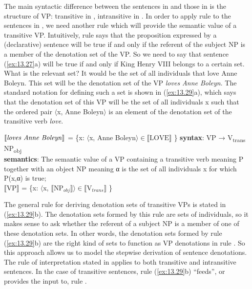 The main syntactic difference between the sentences in  and those in  is the structure of VP: transitive in , intransitive in . In order to apply rule  to the sentences in , we need another rule which will provide the semantic value of a transitive VP. Intuitively, rule  says that the proposition expressed by a (declarative) sentence will be true if and only if the referent of the subject NP is a member of the denotation set of the VP. So we need to say that sentence (\ref{ex:13.27}a) will be true if and only if King Henry VIII belongs to a certain set. What is the relevant set? It would be the set of all individuals that love Anne Boleyn. This set will be the denotation set of the VP \textit{loves Anne Boleyn}. The standard notation for defining such a set is shown in (\ref{ex:13.29}a), which says that the denotation set of this VP will be the set of all individuals x such that the ordered pair $\langle$x, Anne Boleyn$\rangle$ is an element of the denotation set of the transitive verb \textit{love}.


\ea \label{ex:13.29}
\ea $\llbracket\text{\textit{loves Anne Boleyn}}\rrbracket$  = \{x: $\langle$x, Anne Boleyn$\rangle {\in} \llbracket\text{LOVE}\rrbracket$ \}
\ex \textbf{syntax}: VP  →  V\textsubscript{trans}  NP\textsubscript{obj}\\
\textbf{semantics}: The semantic value of a VP containing a transitive verb meaning P together with an object NP meaning α is the set of all individuals x for which P(x,α) is true;\\
{}$\llbracket\text{VP}\rrbracket$  =  \{x: $\langle$x, $\llbracket\text{NP}_{obj}\rrbracket \rangle {\in} \llbracket\text{V}_{trans}\rrbracket$ \}
\z \z


The general rule for deriving denotation sets of transitive VPs is stated in (\ref{ex:13.29}b). The denotation sets formed by this rule are sets of individuals, so it makes sense to ask whether the referent of a subject NP is a member of one of these denotation sets. In other words, the denotation sets formed by rule (\ref{ex:13.29}b) are the right kind of sets to function as VP denotations in rule . So this approach allows us to model the stepwise derivation of sentence denotations. The rule of interpretation stated in  applies to both transitive and intransitive sentences. In the case of transitive sentences, rule (\ref{ex:13.29}b) “feeds”, or provides the input to, rule .



